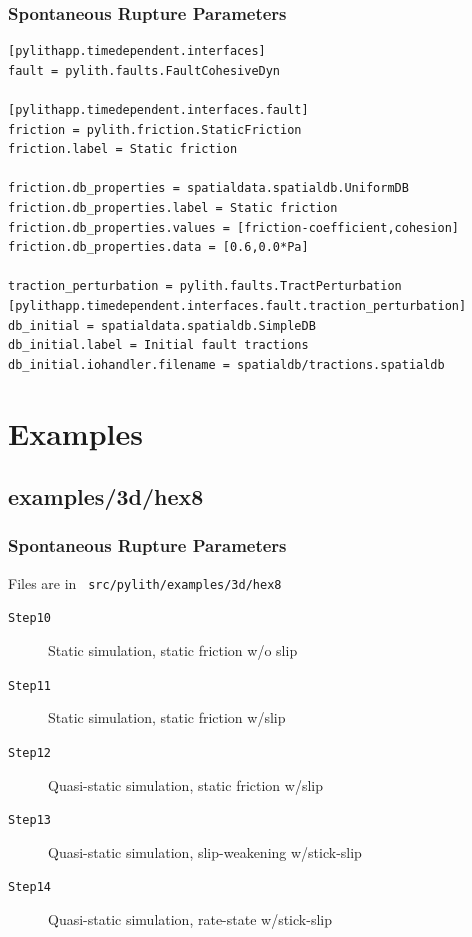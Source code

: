 \documentclass{beamer}
\begin{document}
\begin{frame}[fragile]
  \frametitle{Spontaneous Rupture Parameters}

{\small
\begin{verbatim}
[pylithapp.timedependent.interfaces]
fault = pylith.faults.FaultCohesiveDyn

[pylithapp.timedependent.interfaces.fault]
friction = pylith.friction.StaticFriction
friction.label = Static friction

friction.db_properties = spatialdata.spatialdb.UniformDB
friction.db_properties.label = Static friction
friction.db_properties.values = [friction-coefficient,cohesion]
friction.db_properties.data = [0.6,0.0*Pa]

traction_perturbation = pylith.faults.TractPerturbation
[pylithapp.timedependent.interfaces.fault.traction_perturbation]
db_initial = spatialdata.spatialdb.SimpleDB
db_initial.label = Initial fault tractions
db_initial.iohandler.filename = spatialdb/tractions.spatialdb
\end{verbatim}
}
  
\end{frame}


\section{Examples}
\subsection{examples/3d/hex8}

\begin{frame}
  \frametitle{Spontaneous Rupture Parameters}
  
  \vfill
  Files are in {\tt\color{red} src/pylith/examples/3d/hex8}
  \vfill

  \begin{description}
  \item[{\tt Step10}] Static simulation, static friction w/o slip
  \item[{\tt Step11}] Static simulation, static friction w/slip
  \item[{\tt Step12}] Quasi-static simulation, static friction w/slip
  \item[{\tt Step13}] Quasi-static simulation, slip-weakening w/stick-slip
  \item[{\tt Step14}] Quasi-static simulation, rate-state w/stick-slip
  \end{description}
  
\end{frame}
\end{document}
